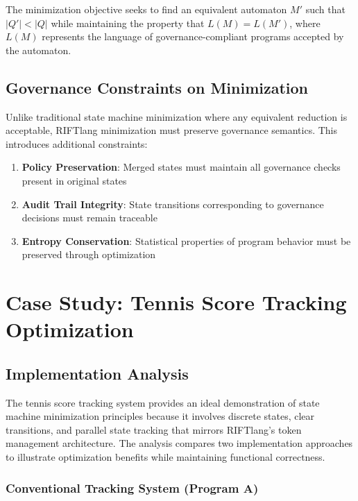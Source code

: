 The minimization objective seeks to find an equivalent automaton $M'$ such that $|Q'| < |Q|$ while maintaining the property that $L(M) = L(M')$, where $L(M)$ represents the language of governance-compliant programs accepted by the automaton.

\subsection{Governance Constraints on Minimization}

Unlike traditional state machine minimization where any equivalent reduction is acceptable, RIFTlang minimization must preserve governance semantics. This introduces additional constraints:

\begin{enumerate}
\item \textbf{Policy Preservation}: Merged states must maintain all governance checks present in original states
\item \textbf{Audit Trail Integrity}: State transitions corresponding to governance decisions must remain traceable
\item \textbf{Entropy Conservation}: Statistical properties of program behavior must be preserved through optimization
\end{enumerate}

\section{Case Study: Tennis Score Tracking Optimization}

\subsection{Implementation Analysis}

The tennis score tracking system provides an ideal demonstration of state machine minimization principles because it involves discrete states, clear transitions, and parallel state tracking that mirrors RIFTlang's token management architecture. The analysis compares two implementation approaches to illustrate optimization benefits while maintaining functional correctness.

\subsubsection{Conventional Tracking System (Program A)}

